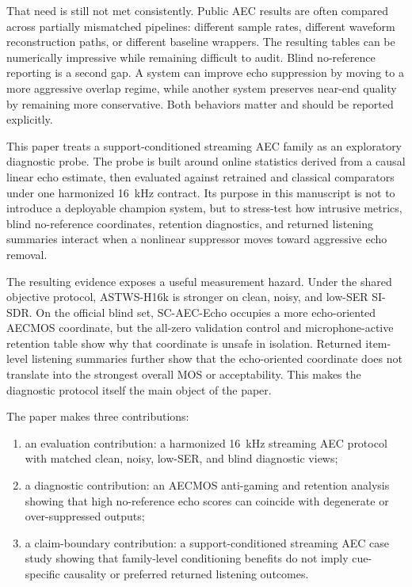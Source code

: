 \documentclass[journal]{IEEEtran}
\begin{document}
That need is still not met consistently. Public AEC results are often compared across partially mismatched pipelines: different sample rates, different waveform reconstruction paths, or different baseline wrappers. The resulting tables can be numerically impressive while remaining difficult to audit. Blind no-reference reporting is a second gap. A system can improve echo suppression by moving to a more aggressive overlap regime, while another system preserves near-end quality by remaining more conservative. Both behaviors matter and should be reported explicitly.

This paper treats a support-conditioned streaming AEC family as an exploratory diagnostic probe. The probe is built around online statistics derived from a causal linear echo estimate, then evaluated against retrained and classical comparators under one harmonized 16~kHz contract. Its purpose in this manuscript is not to introduce a deployable champion system, but to stress-test how intrusive metrics, blind no-reference coordinates, retention diagnostics, and returned listening summaries interact when a nonlinear suppressor moves toward aggressive echo removal.

The resulting evidence exposes a useful measurement hazard. Under the shared objective protocol, ASTWS-H16k is stronger on clean, noisy, and low-SER SI-SDR. On the official blind set, SC-AEC-Echo occupies a more echo-oriented AECMOS coordinate, but the all-zero validation control and microphone-active retention table show why that coordinate is unsafe in isolation. Returned item-level listening summaries further show that the echo-oriented coordinate does not translate into the strongest overall MOS or acceptability. This makes the diagnostic protocol itself the main object of the paper.

The paper makes three contributions:
\begin{enumerate}
    \item an evaluation contribution: a harmonized 16~kHz streaming AEC protocol with matched clean, noisy, low-SER, and blind diagnostic views;
    \item a diagnostic contribution: an AECMOS anti-gaming and retention analysis showing that high no-reference echo scores can coincide with degenerate or over-suppressed outputs;
    \item a claim-boundary contribution: a support-conditioned streaming AEC case study showing that family-level conditioning benefits do not imply cue-specific causality or preferred returned listening outcomes.
\end{enumerate}
\end{document}
